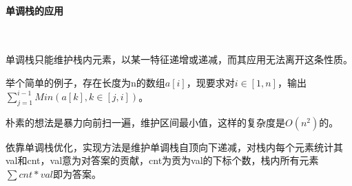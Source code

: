 \paragraph{单调栈的应用}~{}
\par
单调栈只能维护栈内元素，以某一特征递增或递减，而其应用无法离开这条性质。\par
举个简单的例子，存在长度为n的数组$a[i]$，现要求对$i\in [1,n]$，输出$\sum_{j=1}^{i-1}Min(a[k], k\in [j,i])$。\par
朴素的想法是暴力向前扫一遍，维护区间最小值，这样的复杂度是$O(n^2)$的。\par
依靠单调栈优化，实现方法是维护单调栈自顶向下递减，对栈内每个元素统计其val和cnt，val意为对答案的贡献，cnt为贡为val的下标个数，栈内所有元素$\sum cnt*val$即为答案。\par